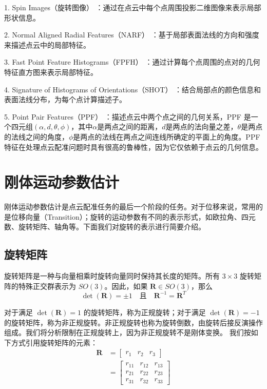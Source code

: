 1. Spin Images（旋转图像） \cite{johnson1997spin}：通过在点云中每个点周围投影二维图像来表示局部形状信息。

2. Normal Aligned Radial Features（NARF） \cite{steder2010narf}：基于局部表面法线的方向和强度来描述点云中的局部特征。

3. Fast Point Feature Histograms（FPFH） \cite{rusu2009fast}：通过计算每个点周围的点对的几何特征直方图来表示局部特征。

4. Signature of Histograms of Orientations（SHOT） \cite{salti2014shot}：结合局部点的颜色信息和表面法线分布，为每个点计算描述子。

5. Point Pair Features（PPF） \cite{deng2018ppfnet}：描述点云中两个点之间的几何关系，PPF 是一个四元组$(\alpha, d, \theta, \phi)$，其中$\alpha$是两点之间的距离，$d$是两点的法向量之差，$\theta$是两点的法线之间的角度，$\phi$是两点的法线在两点之间连线所确定的平面上的角度。PPF特征在处理点云配准问题时具有很高的鲁棒性，因为它仅依赖于点云的几何信息。

\section{刚体运动参数估计}
刚体运动参数估计是点云配准任务的最后一个阶段的任务。对于位移来说，常用的是位移向量（Transition）；旋转的运动参数有不同的表示形式，如欧拉角\cite{pio1966euler}、四元数\cite{shoemake1985animating}、旋转矩阵\cite{horn1954doubly}、轴角\cite{diebel2006representing}等。下面我们对旋转的表示进行简要介绍。

\subsection{旋转矩阵}
旋转矩阵是一种与向量相乘时旋转向量同时保持其长度的矩阵。所有 $3 \times 3$ 旋转矩阵的特殊正交群表示为 $SO(3)$。因此，如果 $\boldsymbol{R} \in SO(3)$，那么
\begin{equation}
\det (\boldsymbol{R}) = \pm1 \quad \text{且} \quad \boldsymbol{R}^{-1} = \boldsymbol{R}^T
\end{equation}

对于满足 $\det (\boldsymbol{R}) = 1$ 的旋转矩阵，称为正规旋转；对于满足 $\det (\boldsymbol{R}) = -1$ 的旋转矩阵，称为非正规旋转。非正规旋转也称为旋转倒数，由旋转后接反演操作组成。我们将分析限制在正规旋转上，因为非正规旋转不是刚体变换。
我们按如下方式引用旋转矩阵的元素：
\begin{align}
    \boldsymbol{R} &=
    \begin{bmatrix}
    r_1 & r_2 & r_3
    \end{bmatrix} \\
    &=
    \begin{bmatrix}
    r_{11} & r_{12} & r_{13} \\
    r_{21} & r_{22} & r_{23} \\
    r_{31} & r_{32} & r_{33}
    \end{bmatrix}
\end{align}

